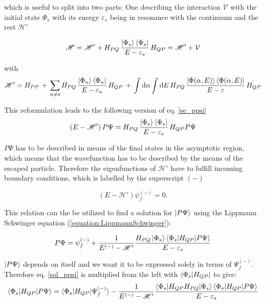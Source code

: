 which is useful to split into two parts: One describing the interaction
$\mathcal{V}$ with the
initial state $\Phi_s$ with its energy $\varepsilon_s$ being in resonance with
the continuum and the rest $\mathscr{H}'$

\begin{equation}
  \mathscr{H} = \mathscr{H}' +
                H_{PQ} \,\frac{\ket{\Phi_s}\bra{\Phi_s}}{E-\varepsilon_s}\, H_{QP}
              = \mathscr{H}' + \mathcal{V}
\end{equation}

with
\begin{equation}
  \mathscr{H}' = H_{PP}\, + \,
  \sum\limits_{n\ne s} H_{PQ} \,\frac{\ket{\Phi_n}\bra{\Phi_n}}{E-\varepsilon_n}
  \, H_{QP} \,+\,
  \int \mathrm{d}\alpha \int\mathrm{d}E \,H_{PQ} \,
  \frac{\ket{\Phi(\alpha,E)}\bra{\Phi(\alpha,E)}}{E-\varepsilon} \, H_{QP}
\end{equation}

This reformulation leads to the following version of eq. \ref{se_ppsi}
\begin{equation}
  (E - \mathscr{H}')\, P \Psi =
   H_{PQ} \,\frac{\ket{\Phi_s}\bra{\Phi_s}}{E-\varepsilon_s}\, H_{QP} P \Psi %
\end{equation}

$P \Psi$ has to be described in means of the final states in the asymptotic
region, which means that the wavefunction has to be described by the means
of the escaped particle. Therefore
the eigenfunctions of $\mathscr{H}'$ have to fulfill incoming boundary conditions,
which is labelled by the superscript $(-)$

\begin{equation}
  (E-\mathscr{H}') \psi_f^{(-)} = 0 \label{sol_outg} .
\end{equation}

This relation can the be utilized to find a solution for $\ket{P \Psi}$
using the Lippmann Schwinger equation (\ref{equation:LippmannSchwinger}):

\begin{equation}\label{sol_ppsi}
  P \Psi = \psi_f^{(-)} + \frac{1}{E^{(-)} - \mathscr{H}'}
           \frac{H_{PQ}\ket{\Phi_s}
           \braket{\Phi_s|H_{QP}|P\Psi}}{E - \varepsilon_s} 
\end{equation}

$\ket{P \Psi}$ depends on itself and we want it to be expressed solely in terms
of $\Psi_f^{(-)}$. Therefore 
eq. \ref{sol_ppsi}
is multiplied from the left with $\bra{\Phi_s|H_{QP}}$ to give:
\begin{equation}
  \braket{\Phi_s|H_{QP}|P\Psi} = \braket{\Phi_s|H_{QP}|\Psi_f^{(-)}} -
  \frac{1}{E^{(-)} - \mathscr{H}'}
  \frac{\braket{\Phi_s|H_{QP}H_{PQ}|\Phi_s} \braket{\Phi_s|H_{QP}|P\Psi}}
       {E - \varepsilon_s}  \label{s_ppsi} 
\end {equation}

